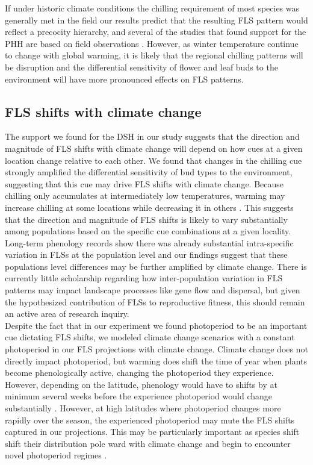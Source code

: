 \documentclass[11pt]{article}
\begin{document}
\noindent If under historic climate conditions the chilling requirement of most species was generally met in the field our results predict that the resulting FLS pattern would reflect a precocity hierarchy, and several of the studies that found support for the PHH are based on field observations \citep[e.g.][]{Guo2014,COSMULESCU:2020aa}. However, as winter temperature continue to change with global warming, it is likely that the regional chilling patterns will be disruption and the differential sensitivity of flower and leaf buds to the environment will have more pronounced effects on FLS patterns.

\subsection*{FLS shifts with climate change}
\noindent The support we found for the DSH in our study suggests that the direction and magnitude of FLS shifts with climate change will depend on how cues at a given location change relative to each other. We found that changes in the chilling cue strongly amplified the differential sensitivity of bud types to the environment, suggesting that this cue may drive FLS shifts with climate change. Because chilling only accumulates at intermediately low temperatures, warming may increase chilling at some locations while decreasing it in others \citep{}. This suggests that the direction and magnitude of FLS shifts is likely to vary substantially among populations based on the specific cue combinations at a given locality. Long-term phenology records show there was already substantial intra-specific variation in FLSs at the population level \citep{Buonaiuto2020} and our findings suggest that these populations level differences may be further amplified by climate change. There is currently little scholarship regarding how inter-population variation in FLS patterns may impact landscape processes like gene flow and dispersal, but given the hypothesized contribution of FLSs to reproductive fitness, this should remain an active area of research inquiry.\\

\noindent Despite the fact that in our experiment we found photoperiod to be an important cue dictating FLS shifts, we modeled climate change scenarios with a constant photoperiod in our FLS projections with climate change. Climate change does not directly impact photoperiod, but warming does shift the time of year when plants become phenologically active, changing the photoperiod they experience. However, depending on the latitude, phenology would have to shifts by at minimum several weeks before the experience photoperiod would change substantially \citep{Ettinger}. However, at high latitudes where photoperiod changes more rapidly over the season, the experienced photoperiod may mute the FLS shifts captured in our projections. This may be particularly important as species shift shift their distribution pole ward with climate change and begin to encounter novel photoperiod regimes \citep{WAY:2015aa}.\\
\end{document}
